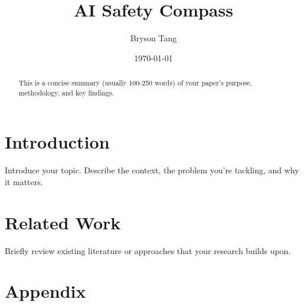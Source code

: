 \documentclass[11pt]{article}
\title{AI Safety Compass}
\author{Bryson Tang}
\date{\today}
\begin{document}
\maketitle

\begin{abstract}
This is a concise summary (usually 100-250 words) of your paper's purpose, methodology, and key findings.
\end{abstract}

\section{Introduction}
Introduce your topic. Describe the context, the problem you're tackling, and why it matters.

\section{Related Work}
Briefly review existing literature or approaches that your research builds upon.









% 
% 

\newpage
\appendix
\section*{Appendix}

\end{document}
